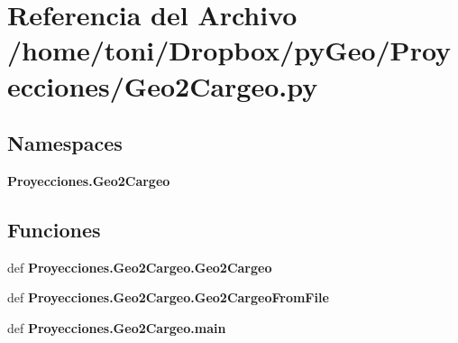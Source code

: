 \section{Referencia del Archivo /home/toni/\-Dropbox/py\-Geo/\-Proyecciones/\-Geo2\-Cargeo.py}
\label{Geo2Cargeo_8py}
\subsection*{Namespaces}
\begin{DoxyCompactItemize}
\item 
{\bf Proyecciones.\-Geo2\-Cargeo}
\end{DoxyCompactItemize}
\subsection*{Funciones}
\begin{DoxyCompactItemize}
\item 
def {\bf Proyecciones.\-Geo2\-Cargeo.\-Geo2\-Cargeo}
\item 
def {\bf Proyecciones.\-Geo2\-Cargeo.\-Geo2\-Cargeo\-From\-File}
\item 
def {\bf Proyecciones.\-Geo2\-Cargeo.\-main}
\end{DoxyCompactItemize}

